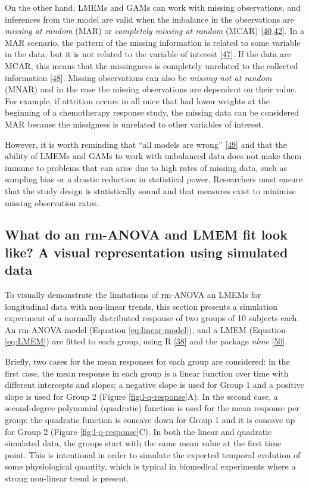 \documentclass[
]{article}
\begin{document}
On the other hand, LMEMs and GAMs can work with missing observations, and inferences from the model are valid when the imbalance in the observations are \emph{missing at random} (MAR) or \emph{completely missing at random} (MCAR) {[}\protect\hyperlink{ref-west2014}{40},\protect\hyperlink{ref-weiss2005}{42}{]}. In a MAR scenario, the pattern of the missing information is related to some variable in the data, but it is not related to the variable of interest {[}\protect\hyperlink{ref-scheffer2002}{47}{]}. If the data are MCAR, this means that the missingness is completely unrelated to the collected information {[}\protect\hyperlink{ref-potthoff2006}{48}{]}. Missing observations can also be \emph{missing not at random} (MNAR) and in the case the missing observations are dependent on their value. For example, if attrition occurs in all mice that had lower weights at the beginning of a chemotherapy response study, the missing data can be considered MAR because the missigness is unrelated to other variables of interest.

However, it is worth reminding that ``all models are wrong'' {[}\protect\hyperlink{ref-box1976}{49}{]} and that the ability of LMEMs and GAMs to work with unbalanced data does not make them immune to problems that can arise due to high rates of missing data, such as sampling bias or a drastic reduction in statistical power. Researchers must ensure that the study design is statistically sound and that measures exist to minimize missing observation rates.

\hypertarget{simulation}{%
\subsection{What do an rm-ANOVA and LMEM fit look like? A visual representation using simulated data}\label{simulation}}

To visually demonstrate the limitations of rm-ANOVA an LMEMs for longitudinal data with non-linear trends, this section presents a simulation experiment of a normally distributed response of two groups of 10 subjects each. An rm-ANOVA model (Equation \eqref{eq:linear-model}), and a LMEM (Equation \eqref{eq:LMEM}) are fitted to each group, using R {[}\protect\hyperlink{ref-r}{38}{]} and the package \emph{nlme} {[}\protect\hyperlink{ref-nlme}{50}{]}.

Briefly, two cases for the mean responses for each group are considered: in the first case, the mean response in each group is a linear function over time with different intercepts and slopes; a negative slope is used for Group 1 and a positive slope is used for Group 2 (Figure \ref{fig:l-q-response}A). In the second case, a second-degree polynomial (quadratic) function is used for the mean response per group: the quadratic function is concave down for Group 1 and it is concave up for Group 2 (Figure \ref{fig:l-q-response}C). In both the linear and quadratic simulated data, the groups start with the same mean value at the first time point. This is intentional in order to simulate the expected temporal evolution of some physiological quantity, which is typical in biomedical experiments where a strong non-linear trend is present.
\end{document}

